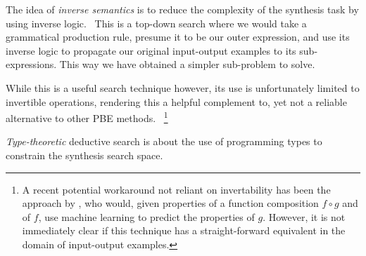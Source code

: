 \documentclass{article}
\begin{document}

The idea of \emph{inverse semantics} is to reduce the complexity
of the synthesis task by using inverse logic.~\citep{flashmeta,prose}
This is a top-down search where we would take a grammatical
production rule, presume it to be our outer expression,
and use its inverse logic to propagate our original
input-output examples to its sub-expressions.
This way we have obtained a simpler sub-problem to solve.


While this is a useful search technique however, its
use is unfortunately limited to invertible operations,
rendering this a helpful complement to, yet not a
reliable alternative to other PBE methods.%
~\footnote{
    A recent potential workaround not reliant on invertability
    has been the approach by \citet{odena2020learning},
    who would, given properties of a function composition
    $f \circ g$ and of $f$, use machine learning to predict
    the properties of $g$.
    However, it is not immediately clear if this technique
    has a straight-forward equivalent in the domain of
    input-output examples.
}


\emph{Type-theoretic} deductive search is about the use of programming
types to constrain the synthesis search space.
\end{document}
